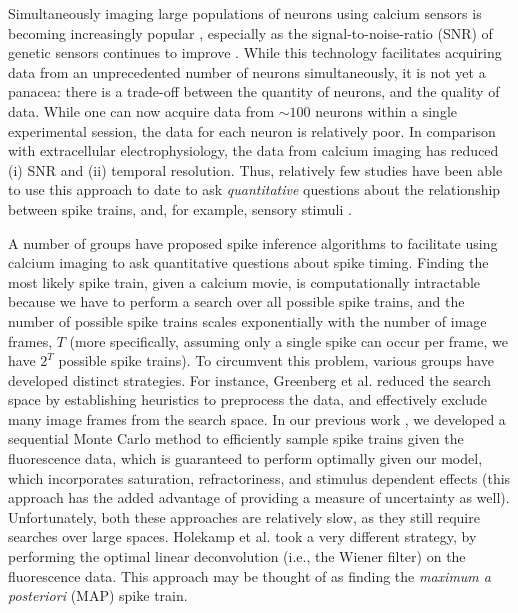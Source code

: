 Simultaneously imaging large populations of neurons using calcium sensors is becoming increasingly popular \cite{YusteKonnerth06, NagayamaChen07, GobelHelmchen07, LuoSvoboda08}, especially as the signal-to-noise-ratio (SNR) of genetic sensors continues to improve \cite{GaraschukKonnerth07, MankGriesbeck08, WallaceHasan08}. While this technology facilitates acquiring data from an unprecedented number of neurons simultaneously, it is not yet a panacea: there is a trade-off between the quantity of neurons, and the quality of data. While one can now acquire data from $\sim 100$ neurons within a single experimental session, the data for each neuron is relatively poor. In comparison with extracellular electrophysiology, the data from calcium imaging has reduced (i) SNR and (ii) temporal resolution. Thus, relatively few studies have been able to use this approach to date to ask \emph{quantitative} questions about the relationship between spike trains, and, for example, sensory stimuli \cite{StosiekKonnerth03, OhkiReid05, OhkiReid06, YaksiFriedrich07, SatoSvoboda07, KerrHelmchen07, OzdenWang08}.  

A number of groups have proposed spike inference algorithms to facilitate using calcium imaging to ask quantitative questions about spike timing. Finding the most likely spike train, given a calcium movie, is computationally intractable because we have to perform a search over all possible spike trains, and the number of possible spike trains scales exponentially with the number of image frames, $T$ (more specifically, assuming only a single spike can occur per frame, we have $2^T$ possible spike trains).  To circumvent this problem, various groups have developed distinct strategies.  For instance, Greenberg et al. \cite{GreenbergKerr08} reduced the search space by establishing heuristics to preprocess the data, and effectively exclude many image frames from the search space.  In our previous work \cite{VogelsteinPaninski09b}, we developed a sequential Monte Carlo method to efficiently sample spike trains given the fluorescence data, which is guaranteed to perform optimally given our model, which incorporates saturation, refractoriness, and stimulus dependent effects (this approach has the added advantage of providing a measure of uncertainty as well). Unfortunately, both these approaches are relatively slow, as they still require searches over large spaces.  Holekamp et al. \cite{HolekampHoly08} took a very different strategy, by performing the optimal linear deconvolution (i.e., the Wiener filter) on the fluorescence data. This approach may be thought of as finding the \emph{maximum a posteriori} (MAP) spike train.  

